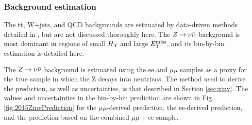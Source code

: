 \subsubsection{Background estimation}
The t$\bar{\text{t}}$, W$+$jets, and QCD backgrounds are estimated by data-driven methods detailed in \cite{CMS:2016nhb}, but are not discussed thoroughly here. The $Z\rightarrow \nu\bar{\nu}$ background is most dominant in regions of small $H_{\rm T}$ and large $E_{\text{T}}^{\rm miss}$, and its bin-by-bin estimation is detailed here.

The $Z\rightarrow \nu\bar{\nu}$ background is estimated using the ee and $\mu\mu$ samples as a proxy for the true sample in which the Z decays into neutrinos. The method used to derive the prediction, as well as uncertainties, is that described in Section \ref{sec:zinv}. The values and uncertainties in the bin-by-bin prediction are shown in Fig. \ref{fig:2015ZinvPrediction} for the $\mu\mu$-derived prediction, the ee-derived prediction, and the prediction based on the combined $\mu\mu+$ee sample. 
